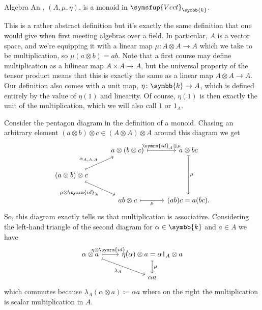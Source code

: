 \documentclass[fleqn]{NotesClass}
\makeatletter
\newcommand{\c@egory}[1]{\symsfup{#1}}
\newcommand{\Vect}[1][\field]{\c@egory{Vect}_{#1}}
\newcommand{\id}{\symrm{id}}
\renewcommand{\field}{\symbb{k}}
\makeatother
\begin{document}
    \begin{dfn}{Algebra}{}
        An , \((A, \mu, \eta)\), is a monoid in \(\Vect\).
    \end{dfn}
    
    This is a rather abstract definition but it's exactly the same definition that one would give when first meeting algebras over a field.
    In particular, \(A\) is a vector space, and we're equipping it with a linear map \(\mu \colon A \otimes A \to A\) which we take to be multiplication, so \(\mu(a \otimes b) = ab\).
    Note that a first course may define multiplication as a bilinear map \(A \times A \to A\), but the universal property of the tensor product means that this is exactly the same as a linear map \(A \otimes A \to A\).
    Our definition also comes with a unit map, \(\eta \colon \field \to A\), which is defined entirely by the value of \(\eta(1)\) and linearity.
    Of course, \(\eta(1)\) is then exactly the unit of the multiplication, which we will also call \(1\) or \(1_A\).
    
    Consider the pentagon diagram in the definition of a monoid.
    Chasing an arbitrary element \((a \otimes b) \otimes c \in (A \otimes A) \otimes A\) around this diagram we get
    \begin{equation}
        \begin{tikzcd}
            & a \otimes (b \otimes c) \arrow[r, mapsto, "\id_A \otimes \mu"] & a \otimes bc \arrow[dd, mapsto, "\mu"]\\
            (a \otimes b) \otimes c \arrow[ur, mapsto, "{\alpha_{A,A,A}}"] \arrow[dr, mapsto, "\mu \otimes \id_A"']\\
            & ab \otimes c \arrow[r, mapsto, "\mu"'] & (ab)c = a(bc).
        \end{tikzcd}
    \end{equation}
    So, this diagram exactly tells us that multiplication is associative.
    Considering the left-hand triangle of the second diagram for \(\alpha \in \field\) and \(a \in A\) we have
    \begin{equation}
        \begin{tikzcd}
            \alpha \otimes a \arrow[r, mapsto, "\eta \otimes \id_A"] \arrow[dr, mapsto, "\lambda_A"'] & \eta(\alpha) \otimes a = \alpha 1_A \otimes a \arrow[d, mapsto, "\mu"]\\
            & \alpha a
        \end{tikzcd}
    \end{equation}
    which commutes because \(\lambda_A(\alpha \otimes a) \coloneqq \alpha a\) where  on the right the multiplication is scalar multiplication in \(A\).
    
\end{document}
